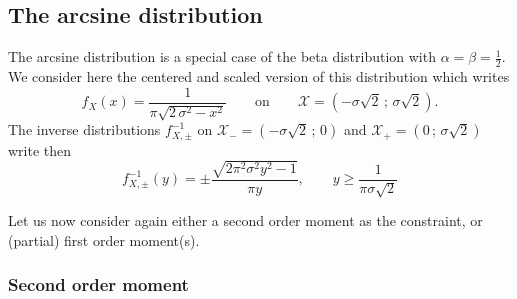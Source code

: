 \documentclass[entropy,article,submit,moreauthors,pdftex]{Definitions/mdpi}
\def\X{\mathcal{X}}%
\begin{document}

\subsection{The arcsine distribution}
\label{subsecapp:Arcsine}

The arcsine distribution is a special case of the beta distribution with $\alpha
= \beta  = \frac12$. We  consider here the centered  and scaled version  of this
distribution which writes
%
\[
f_X(x) = \frac{1}{\pi\sqrt{  2 \, \sigma^2 - x^2}} \qquad  \mbox{on} \qquad \X =
\left( - \sigma \sqrt2 \, ; \, \sigma \sqrt2 \right).
\]
%
The inverse distributions $f_{X,\pm}^{-1}$ on $\X_-  = \left( - \sigma \sqrt2 \,
; \, 0 \right)$ and $\X_+ = \left( 0 \, ; \, \sigma \sqrt2 \right)$ write then
%
\[
f_{X,\pm}^{-1}(y) = \pm \frac{\sqrt{2 \pi^2 \sigma^2  y^2 - 1}}{\pi y}, \qquad y
\ge \frac{1}{\pi \sigma \sqrt2}
\]


Let us  now consider again  either a second order  moment as the  constraint, or
(partial) first order moment(s).



\subsubsection{Second order moment}
\label{subsubsecapp:ArcsineSecondOrder}
\end{document}
